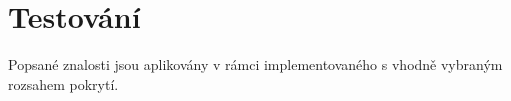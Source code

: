 \chapter{Testování}\label{ch:testing}


Popsané znalosti jsou aplikovány v rámci implementovaného  s vhodně vybraným rozsahem pokrytí.



